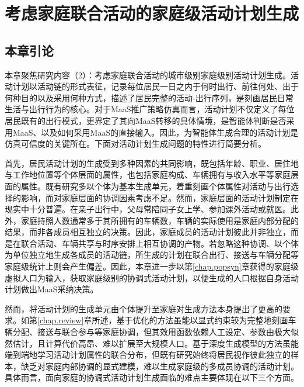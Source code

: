 \setlength{\baselineskip}{20pt}
\chapter{考虑家庭联合活动的家庭级活动计划生成}\label{chap.cohact}
 

\section{本章引论}\label{sec.cohact.intro}

本章聚焦研究内容（2）：考虑家庭联合活动的城市级别家庭级别活动计划生成。活动计划以活动链的形式表征，记录每位居民一日之内于何时出行、前往何处、出于何种目的以及采用何种方式，描述了居民完整的活动-出行序列，是刻画居民日常生活与出行行为的核心。对于MaaS推广策略仿真而言，活动计划不仅定义了每位居民既有的出行模式，更界定了其向MaaS转移的具体情境，是智能体判断是否采用MaaS、以及如何采用MaaS的直接输入。因此，为智能体生成合理的活动计划是仿真可信度的关键所在。下面对活动计划生成问题的特性进行简要分析。

首先，居民活动计划的生成受到多种因素的共同影响，既包括年龄、职业、居住地与工作地位置等个体层面的属性，也包括家庭构成、车辆拥有与收入水平等家庭层面的属性。既有研究多以个体为基本生成单元，着重刻画个体属性对活动与出行选择的影响，而对家庭层面的协调因素考虑不足。然而，家庭层面的活动计划制定在现实中十分普遍。在亲子出行中，父母常陪同子女上学、参加课外活动或就医。此外，家庭持照人数通常多于其所拥有的车辆数，车辆的实际使用是家庭内部分配的结果，而非各成员相互独立的决策。因此，家庭成员的活动计划彼此并非独立，而是在联合活动、车辆共享与时序安排上相互协调的产物。若忽略这种协调、以个体为单位独立地生成各成员的活动链，所生成的计划在联合出行、接送与车辆分配等家庭级统计上则会产生偏差。因此，本章进一步以第\ref{chap.popsyn}章获得的家庭级虚拟人口为输入，获取家庭级别的协调式活动计划，以便生成的人口根据自身活动计划做出MaaS采纳决策。
 
然而，将活动计划的生成单元由个体提升至家庭对生成方法本身提出了更高的要求。如第\ref{chap.review}章所述，基于优化的方法虽能以显式约束较为完整地刻画车辆分配、接送与联合参与等家庭协调，但其效用函数依赖人工设定、参数由极大似然估计，且计算代价高昂、难以扩展至大规模人口。基于深度生成模型的方法虽能端到端地学习活动计划属性的联合分布，但既有研究始终将居民视作彼此独立的样本，缺乏对家庭内部协调的显式建模，难以生成家庭级的多成员协调的活动计划。具体而言，面向家庭的协调式活动计划生成面临的难点主要体现在以下三个方面。
 

